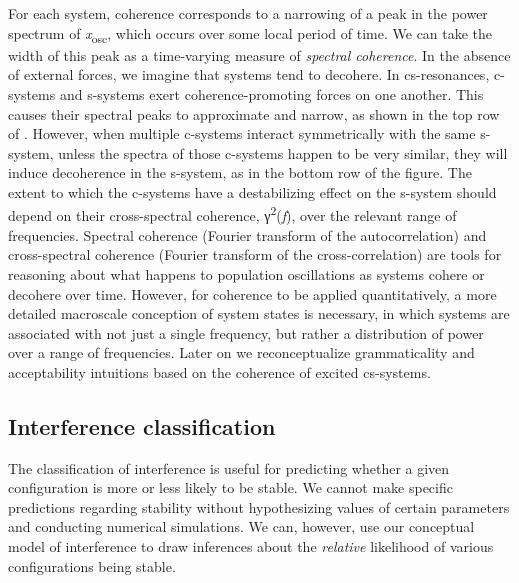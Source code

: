   For each system, coherence corresponds to a narrowing of a peak in the power spectrum of \textit{x}\textsubscript{osc}, which occurs over some local period of time. We can take the width of this peak as a time-varying measure of \textit{spectral coherence}. In the absence of external forces, we imagine that systems tend to decohere. In cs-resonances, c-systems and s-systems exert coherence-promoting forces on one another. This causes their spectral peaks to approximate and narrow, as shown in the top row of {}. However, when multiple c-systems interact symmetrically with the same s-system, unless the spectra of those c-systems happen to be very similar, they will induce decoherence in the s-system, as in the bottom row of the figure. The extent to which the c-systems have a destabilizing effect on the s-system should depend on their cross-spectral coherence, γ\textsuperscript{2}(\textit{f}), over the relevant range of frequencies. Spectral coherence (Fourier transform of the autocorrelation) and cross-spectral coherence (Fourier transform of the cross-correlation) are tools for reasoning about what happens to population oscillations as systems cohere or decohere over time. However, for coherence to be applied quantitatively, a more detailed macroscale conception of system states is necessary, in which systems are associated with not just a single frequency, but rather a distribution of power over a range of frequencies. Later on we reconceptualize grammaticality and acceptability intuitions based on the coherence of excited cs-systems.

\subsection{Interference classification}

The classification of interference is useful for predicting whether a given configuration is more or less likely to be stable. We cannot make specific predictions regarding stability without hypothesizing values of certain parameters and conducting numerical simulations. We can, however, use our conceptual model of interference to draw inferences about the \textit{relative} likelihood of various configurations being stable.

